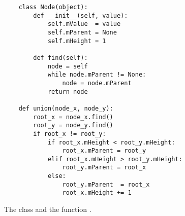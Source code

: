 \begin{figure}[!ht]
\centering
\begin{verbatim}
    class Node(object):
        def __init__(self, value):
            self.mValue  = value
            self.mParent = None
            self.mHeight = 1
    
        def find(self):
            node = self
            while node.mParent != None:
                node = node.mParent
            return node
    
    def union(node_x, node_y):
        root_x = node_x.find()
        root_y = node_y.find()
        if root_x != root_y:
            if root_x.mHeight < root_y.mHeight:
                root_x.mParent = root_y
            elif root_x.mHeight > root_y.mHeight:
                root_y.mParent = root_x
            else:
                root_y.mParent  = root_x
                root_x.mHeight += 1       
\end{verbatim}
\vspace*{-0.3cm}
\caption{The class  and the function .}
\label{fig:Union-Find-OO.ipynb}
\end{figure}

